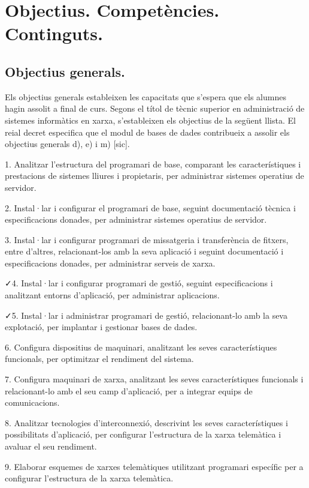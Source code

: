 \documentclass[catalan, a4paper, 12pt, titlepage]{article}
\begin{document}
\section{Objectius. Competències. Continguts.}
\label{sec:continguts}

\subsection{Objectius generals.}

Els objectius generals estableixen les capacitats que s'espera que els alumnes hagin assolit a final de curs. Segons el títol de tècnic superior en administració de sistemes informàtics en xarxa, s'estableixen els objectius de la següent llista.
El reial decret especifica que el modul de bases de dades contribueix a assolir els objectius generals d), e) i m) [sic].

1. Analitzar l'estructura del programari de base, comparant les característiques i prestacions de sistemes lliures i propietaris, per administrar sistemes operatius de servidor.

2. Instal·lar i configurar el programari de base, seguint documentació tècnica i especificacions donades, per administrar sistemes operatius de servidor.

3. Instal·lar i configurar programari de missatgeria i transferència de fitxers, entre d'altres, relacionant-los amb la seva aplicació i seguint documentació i especificacions donades, per administrar serveis de xarxa.

\faCheck 4. Instal·lar i configurar programari de gestió, seguint especificacions i analitzant entorns d'aplicació, per administrar aplicacions.

\faCheck 5. Instal·lar i administrar programari de gestió, relacionant-lo amb la seva explotació, per implantar i gestionar bases de dades.

6. Configura dispositius de maquinari, analitzant les seves característiques funcionals, per optimitzar el rendiment del sistema.

7. Configura maquinari de xarxa, analitzant les seves característiques funcionals i relacionant-lo amb el seu camp d'aplicació, per a integrar equips de comunicacions.

8. Analitzar tecnologies d'interconnexió, descrivint les seves característiques i possibilitats d'aplicació, per configurar l'estructura de la xarxa telemàtica i avaluar el seu rendiment.

9. Elaborar esquemes de xarxes telemàtiques utilitzant programari específic per a configurar l'estructura de la xarxa telemàtica.
\end{document}
